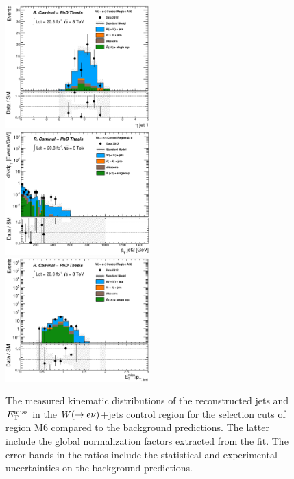 \begin{figure}[!ht]
\begin{center}
{      \includegraphics[width=0.495\textwidth]{Appendix_FluctuationM6/Figures/plot_Stop_A10_CRele_eta1_fitted.eps}
    }
    \mbox{
      \includegraphics[width=0.495\textwidth]{Appendix_FluctuationM6/Figures/plot_Stop_A10_CRele_pt2_fitted.eps}
      \includegraphics[width=0.495\textwidth]{Appendix_FluctuationM6/Figures/plot_Stop_A10_CRele_metpt1_fitted.eps}
    }
  \end{center}
  \caption[Kinematic distributions of the reconstructed jets and $\met$ in the $\wen$+jets control region for the selection cuts of region M6, after the normalization factors extracted from the fit have been applied.]{The measured kinematic distributions of the reconstructed jets and $\met$ in the $\wen$+jets control region for the selection cuts of region M6 compared to the background predictions. The latter include the global normalization factors extracted from the fit. The error bands in the ratios include the statistical and experimental uncertainties on the background predictions.}
  \label{fig:Plot_M6_CRele_Jetkinematics}
\end{figure}

